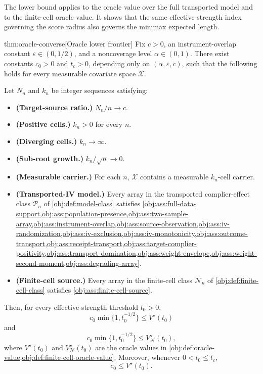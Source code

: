 \documentclass[11pt]{article}
\begin{document}
The lower bound applies to the oracle value over the full transported model and to the finite-cell oracle value. It shows that the same effective-strength index governing the score radius also governs the minimax expected length.

\begin{theoremv}{thm:oracle-converse}[Oracle lower frontier]
Fix \(c>0\), an instrument-overlap constant \(\varepsilon\in(0,1/2)\), and a noncoverage level \(\alpha\in(0,1)\). There exist constants \(c_0>0\) and \(t_c>0\), depending only on \((\alpha,\varepsilon,c)\), such that the following holds for every measurable covariate space \(\mathcal X\).

Let \(N_n\) and \(k_n\) be integer sequences satisfying:
\begin{itemize}
\item \textbf{(Target-source ratio.)} \(N_n/n\to c\).
\item \textbf{(Positive cells.)} \(k_n>0\) for every \(n\).
\item \textbf{(Diverging cells.)} \(k_n\to\infty\).
\item \textbf{(Sub-root growth.)} \(k_n/\sqrt n\to 0\).
\item \textbf{(Measurable carrier.)} For each \(n\), \(\mathcal X\) contains a measurable \(k_n\)-cell carrier.
\item \textbf{(Transported-IV model.)} Every array in the transported complier-effect class \(\mathcal P_n\) of \cref{obj:def:model-class} satisfies \cref{obj:ass:full-data-support,obj:ass:population-presence,obj:ass:two-sample-array,obj:ass:instrument-overlap,obj:ass:source-observation,obj:ass:iv-randomization,obj:ass:iv-exclusion,obj:ass:iv-monotonicity,obj:ass:outcome-transport,obj:ass:receipt-transport,obj:ass:target-complier-positivity,obj:ass:transport-domination,obj:ass:weight-envelope,obj:ass:weight-second-moment,obj:ass:degrading-array}.
\item \textbf{(Finite-cell source.)} Every array in the finite-cell class \(\mathcal N_n\) of \cref{obj:def:finite-cell-class} satisfies \cref{obj:ass:finite-cell-source}.
\end{itemize}

Then, for every effective-strength threshold \(t_0>0\),
\[
  c_0 \min\{1,t_0^{-1/2}\}
  \le V^\star(t_0)
\]
and
\[
  c_0 \min\{1,t_0^{-1/2}\}
  \le V_{\mathcal N}^\star(t_0),
\]
where \(V^\star(t_0)\) and \(V_{\mathcal N}^\star(t_0)\) are the oracle values in \cref{obj:def:oracle-value,obj:def:finite-cell-oracle-value}. Moreover, whenever \(0<t_0\le t_c\),
\[
  c_0 \le V^\star(t_0).
\]
\end{theoremv}
\end{document}
